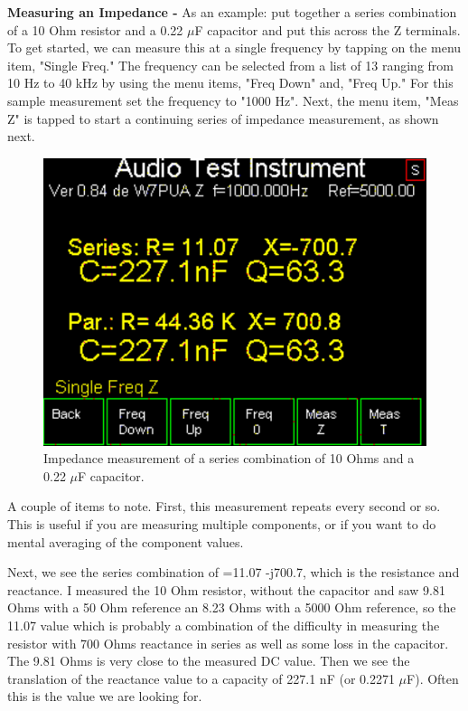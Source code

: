 \textbf{Measuring an Impedance - }As an example: put together a series combination of a 10 Ohm resistor and a 0.22 $\mu$F capacitor and put this across the Z terminals. To get started, we can measure this at a single frequency by tapping on the menu item, "Single Freq." The frequency can be selected from a list of 13 ranging from 10 Hz to 40 kHz by using the menu items, "Freq Down" and, "Freq Up."  For this sample measurement set the frequency to "1000 Hz".  Next, the menu item, "Meas Z" is tapped to start a continuing series of impedance measurement, as shown next.
\begin{figure}[H]
\begin{center}
\includegraphics[scale=0.75]{./images/AVNA_006.pdf}
\caption{Impedance measurement of a series combination of 10 Ohms and a 0.22 $\mu$F capacitor.}
\label{AVNA_006-label}
\end{center}
\end{figure}
A couple of items to note.  First, this measurement repeats every second or so.
This is useful if you are measuring multiple components, or if you want to do mental averaging of the component values.

Next, we see the series combination of  =11.07 -j700.7, which is the resistance and reactance. I measured the 10 Ohm resistor, without the capacitor and saw 9.81 Ohms with a 50 Ohm reference an 8.23 Ohms with a 5000 Ohm reference, so the 11.07 value which is probably a combination of the difficulty in measuring the resistor with 700 Ohms reactance in series as well as some loss in the capacitor.  The 9.81 Ohms is very close to the measured DC value. Then we see the translation of the reactance value to a capacity of 227.1 nF (or 0.2271 $\mu$F).  Often this is the value we are looking for.

